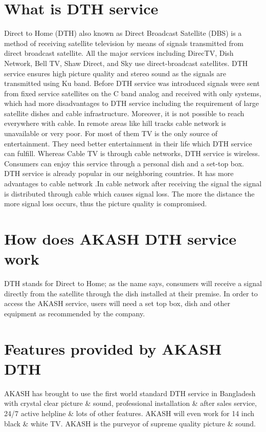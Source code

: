 \begin{spacing}{1.5}
\section{What is DTH service}
Direct to Home (DTH) also known as Direct Broadcast Satellite (DBS) is a method of receiving satellite television by means of signals transmitted from direct broadcast satellite. All the major services including DirecTV, Dish Network, Bell TV, Shaw Direct, and Sky use direct-broadcast satellites. DTH service ensures high picture quality and stereo sound as the signals are transmitted using Ku band.
Before DTH service was introduced signals were sent from fixed service satellites on the C band analog and received with only systems, which had more disadvantages to DTH service including the requirement of large satellite dishes and cable infrastructure. Moreover, it is not possible to reach everywhere with cable. In remote areas like hill tracks cable network is unavailable or very poor. For most of them TV is the only source of entertainment. They need better entertainment in their life which DTH service can fulfill. Whereas Cable TV is through cable networks, DTH service is wireless. Consumers can enjoy this service through a personal dish and a set-top box. DTH service is already popular in our neighboring countries. It has more advantages to cable network .In cable network after receiving the signal the signal is distributed through cable which causes signal loss. The more the distance the more signal loss occurs, thus the picture quality is compromised.

\section{How does AKASH DTH service work}
DTH stands for Direct to Home; as the name says, consumers will receive a signal directly from the satellite through the dish installed at their premise. In order to access the AKASH service, users will need a set top box, dish and other equipment as recommended by the company. 

\section{Features provided by AKASH DTH}
AKASH has brought to use the first world standard DTH service in Bangladesh with crystal clear picture \& sound, professional installation \& after sales service, 24/7 active helpline \& lots of other features. AKASH will even work for 14 inch black \& white TV. AKASH is the purveyor of supreme quality picture \& sound. 


\end{spacing}

